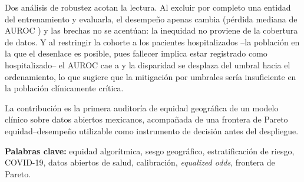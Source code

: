 Dos análisis de robustez acotan la lectura. Al excluir por completo una entidad
del entrenamiento y evaluarla, el desempeño apenas cambia (pérdida mediana de
AUROC \loeoMediana) y las brechas no se acentúan: la inequidad no proviene de la
cobertura de datos. Y al restringir la cohorte a los pacientes hospitalizados
--la población en la que el desenlace es posible, pues fallecer implica estar
registrado como hospitalizado-- el AUROC cae a \hospAUROC{} y la disparidad se
desplaza del umbral hacia el ordenamiento, lo que sugiere que la mitigación por
umbrales sería insuficiente en la población clínicamente crítica.

La contribución es la primera auditoría de equidad geográfica de un modelo
clínico sobre datos abiertos mexicanos, acompañada de una frontera de Pareto
equidad--desempeño utilizable como instrumento de decisión antes del despliegue.

\vspace{1em}
\noindent\textbf{Palabras clave:} equidad algorítmica, sesgo geográfico,
estratificación de riesgo, COVID-19, datos abiertos de salud, calibración,
\emph{equalized odds}, frontera de Pareto.

\cleardoublepage

